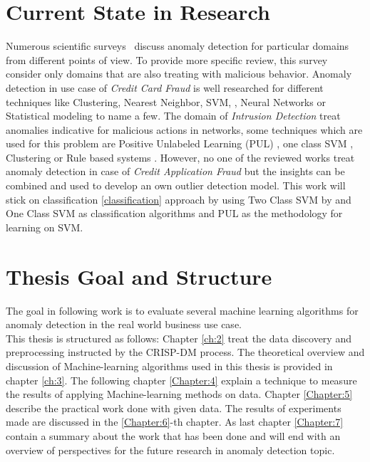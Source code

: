 \section{Current State in Research}\label{state-of-the-art}
Numerous scientific surveys~\cite{Agyemang:2006:CSN:1609942.1609946,Chandola:2009:ADS:1541880.1541882,Chandola:2012:ADD:2197072.2197116,Pimentel:2014:RRN:2588908.2589196} discuss anomaly detection for particular domains from different points of view. To provide more specific review, this survey consider only domains that are also treating with malicious behavior. Anomaly detection in use case of \textit{Credit Card Fraud} is well researched for different techniques like Clustering, Nearest Neighbor, SVM, \cite{Eskin:2010}, Neural Networks \cite{Ghosh;Reilly;1994} or Statistical modeling \cite{Agarwal:2005} to name a few. The domain of \textit{Intrusion Detection} treat anomalies indicative for malicious actions in networks, some techniques which are used for this problem are Positive Unlabeled Learning (PUL) \cite{Eskin:2010}, one class SVM \cite{Kavitha:2015}, Clustering \cite{Chandola:2006} or Rule based systems \cite{Salvador:2005}. However, no one of the reviewed works treat anomaly detection in case of \textit{Credit Application Fraud} but the insights can be combined and used to develop an own outlier detection model. 
This work will stick on classification \ref{classification} approach by using Two Class SVM by \cite{Cortes;Vapnik:1995} and One Class SVM \cite{Tax:2004:SVD:960091.960109} as classification algorithms and PUL \cite{Elkan:2008:LCO:1401890.1401920} as the methodology for learning on SVM. %


\section{Thesis Goal and Structure}\label{goalandstructure}
The goal in following work is to evaluate several machine learning algorithms for anomaly detection in the real world business use case. \\%
This thesis is structured as follows: Chapter \ref{ch:2} treat the data discovery and preprocessing instructed by the CRISP-DM process. The theoretical overview and discussion of Machine-learning algorithms used in this thesis is provided in chapter \ref{ch:3}. The following chapter \ref{Chapter:4} explain a technique to measure the results of applying Machine-learning methods on data. Chapter \ref{Chapter:5} describe the practical work done with given data. The results of experiments made are discussed in the \ref{Chapter:6}-th chapter. As last chapter \ref{Chapter:7} contain a summary about the work that has been done and will end with an overview of perspectives for the future research in anomaly detection topic. 

